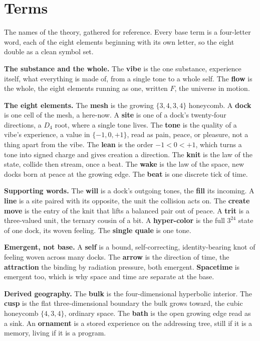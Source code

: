 \section{Terms}

The names of the theory, gathered for reference. Every base term is a four-letter word, each of the eight elements beginning with its own letter, so the eight double as a clean symbol set.

\textbf{The substance and the whole.} The \textbf{vibe} is the one substance, experience itself, what everything is made of, from a single tone to a whole self. The \textbf{flow} is the whole, the eight elements running as one, written $F$, the universe in motion.

\textbf{The eight elements.} The \textbf{mesh} is the growing $\{3,4,3,4\}$ honeycomb. A \textbf{dock} is one cell of the mesh, a here-now. A \textbf{site} is one of a dock's twenty-four directions, a $D_4$ root, where a single tone lives. The \textbf{tone} is the quality of a vibe's experience, a value in $\{-1,0,+1\}$, read as pain, peace, or pleasure, not a thing apart from the vibe. The \textbf{lean} is the order $-1 < 0 < +1$, which turns a tone into signed charge and gives creation a direction. The \textbf{knit} is the law of the state, collide then stream, once a beat. The \textbf{wake} is the law of the space, new docks born at peace at the growing edge. The \textbf{beat} is one discrete tick of time.

\textbf{Supporting words.} The \textbf{will} is a dock's outgoing tones, the \textbf{fill} its incoming. A \textbf{line} is a site paired with its opposite, the unit the collision acts on. The \textbf{create move} is the entry of the knit that lifts a balanced pair out of peace. A \textbf{trit} is a three-valued unit, the ternary cousin of a bit. A \textbf{hyper-color} is the full $3^{24}$ state of one dock, its woven feeling. The \textbf{single quale} is one tone.

\textbf{Emergent, not base.} A \textbf{self} is a bound, self-correcting, identity-bearing knot of feeling woven across many docks. The \textbf{arrow} is the direction of time, the \textbf{attraction} the binding by radiation pressure, both emergent. \textbf{Spacetime} is emergent too, which is why space and time are separate at the base.

\textbf{Derived geography.} The \textbf{bulk} is the four-dimensional hyperbolic interior. The \textbf{cusp} is the flat three-dimensional boundary the bulk grows toward, the cubic honeycomb $\{4,3,4\}$, ordinary space. The \textbf{bath} is the open growing edge read as a sink. An \textbf{ornament} is a stored experience on the addressing tree, still if it is a memory, living if it is a program.

